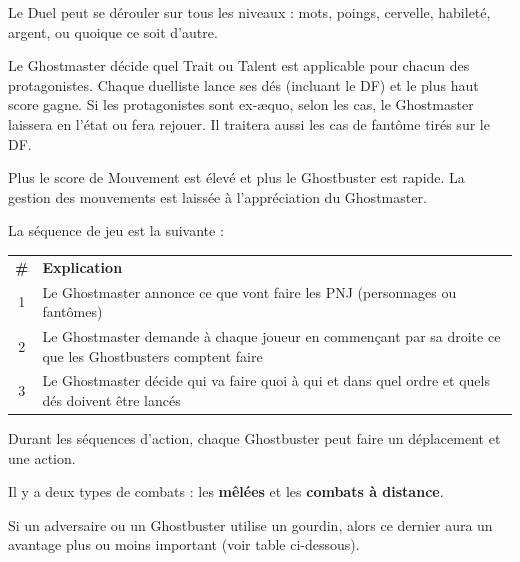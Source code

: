 \begin{frame}[b]
{\begin{minipage}[c][0.95\textheight][c]{\linewidth}

\myindent Le Duel peut se dérouler sur tous les niveaux : mots, poings, cervelle, habileté, argent, ou quoique ce soit d'autre.

\end{minipage}
}
{
\begin{minipage}[c][0.95\textheight][c]{\linewidth}
\myindent Le Ghostmaster décide quel Trait ou Talent est applicable pour chacun des protagonistes. Chaque duelliste lance ses dés (incluant le DF) et le plus haut score gagne. Si les protagonistes sont ex-æquo, selon les cas, le Ghostmaster laissera en l'état ou fera rejouer. Il traitera aussi les cas de fantôme tirés sur le DF.


\myindent Plus le score de Mouvement est élevé et plus le Ghostbuster est rapide. La gestion des mouvements est laissée à l'appréciation du Ghostmaster.


\myindent La séquence de jeu est la suivante :

\begin{center}
\begin{tabular}{c p{7.5cm}}
\textbf{\#} & \textbf{Explication}\\
1 & Le Ghostmaster annonce ce que vont faire les PNJ (personnages ou fantômes) \\
2 & Le Ghostmaster demande à chaque joueur en commençant par sa droite ce que les Ghostbusters comptent faire \\
3 & Le Ghostmaster décide qui va faire quoi à qui et dans quel ordre et quels dés doivent être lancés \\
\end{tabular}
\end{center}

\myindent Durant les séquences d'action, chaque Ghostbuster peut faire un déplacement et une action.

\myindent Il y a deux types de combats : les \textbf{mêlées} et les \textbf{combats à distance}.



\myindent Si un adversaire ou un Ghostbuster utilise un gourdin, alors ce dernier aura un avantage plus ou moins important (voir table ci-dessous).


\end{minipage}}
\end{frame}

